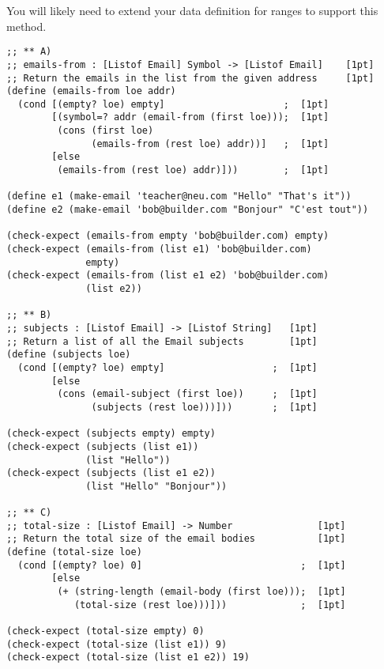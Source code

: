 \documentclass[12pt]{article}                   %
\newenvironment{solution}{}{}
\begin{document}
\begin{problem}
\begin{itemize}
  You will likely need to extend your data definition for ranges to
  support this method.  

\end{itemize}

\newpage
\ifrubric{}
\newpage
\fi

\begin{solution}
\begin{verbatim}
;; ** A)
;; emails-from : [Listof Email] Symbol -> [Listof Email]    [1pt]
;; Return the emails in the list from the given address     [1pt]
(define (emails-from loe addr)
  (cond [(empty? loe) empty]                     ;  [1pt]
        [(symbol=? addr (email-from (first loe)));  [1pt]
         (cons (first loe)
               (emails-from (rest loe) addr))]   ;  [1pt]
        [else
         (emails-from (rest loe) addr)]))        ;  [1pt]

(define e1 (make-email 'teacher@neu.com "Hello" "That's it"))
(define e2 (make-email 'bob@builder.com "Bonjour" "C'est tout"))

(check-expect (emails-from empty 'bob@builder.com) empty)
(check-expect (emails-from (list e1) 'bob@builder.com)
              empty)
(check-expect (emails-from (list e1 e2) 'bob@builder.com)
              (list e2))

;; ** B)
;; subjects : [Listof Email] -> [Listof String]   [1pt]
;; Return a list of all the Email subjects        [1pt]
(define (subjects loe)
  (cond [(empty? loe) empty]                   ;  [1pt]
        [else
         (cons (email-subject (first loe))     ;  [1pt]
               (subjects (rest loe)))]))       ;  [1pt]

(check-expect (subjects empty) empty)
(check-expect (subjects (list e1))
              (list "Hello"))
(check-expect (subjects (list e1 e2))
              (list "Hello" "Bonjour"))

;; ** C)
;; total-size : [Listof Email] -> Number               [1pt]
;; Return the total size of the email bodies           [1pt]
(define (total-size loe)
  (cond [(empty? loe) 0]                            ;  [1pt]
        [else
         (+ (string-length (email-body (first loe)));  [1pt]
            (total-size (rest loe)))]))             ;  [1pt]

(check-expect (total-size empty) 0)
(check-expect (total-size (list e1)) 9)
(check-expect (total-size (list e1 e2)) 19)
\end{verbatim}
\end{solution}
\end{problem}
\ifrubric\bigskip\else
\newpage
\fi
\end{document}
